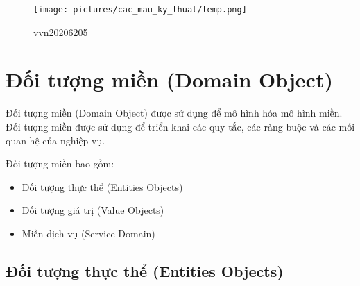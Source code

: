 \begin{figure}[H]

\centering

\texttt{[image: pictures/cac\_mau\_ky\_thuat/temp.png]}

\caption{vvn20206205}

\end{figure}














\section{Đối tượng miền (Domain Object)}

Đối tượng miền (Domain Object) được sử dụng để mô hình hóa mô hình miền. Đối tượng miền được sử dụng để triển khai các quy tắc, các ràng buộc và các mối quan hệ của nghiệp vụ.

Đối tượng miền bao gồm:

\begin{itemize}

\item Đối tượng thực thể (Entities Objects)

\item Đối tượng giá trị (Value Objects)

\item Miền dịch vụ (Service Domain)

\end{itemize}

\subsection{Đối tượng thực thể (Entities Objects)}

